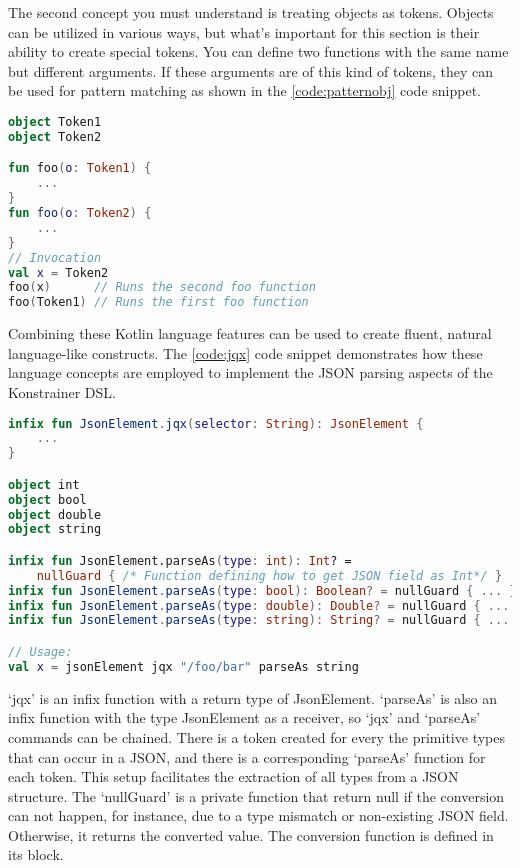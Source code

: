The second concept you must understand is treating objects as tokens. Objects can be utilized in various ways, but what's important for this section is their ability to create special tokens. You can define two functions with the same name but different arguments. If these arguments are of this kind of tokens, they can be used for pattern matching as shown in the \ref{code:patternobj} code snippet.

\begin{lstlisting}[caption={Pattern matching},language=Kotlin,label=code:patternobj]
object Token1
object Token2

fun foo(o: Token1) {
    ...
}
fun foo(o: Token2) {
    ...
}
// Invocation
val x = Token2
foo(x)      // Runs the second foo function
foo(Token1) // Runs the first foo function
\end{lstlisting}

Combining these Kotlin language features can be used to create fluent, natural language-like constructs. The \ref{code:jqx} code snippet demonstrates how these language concepts are employed to implement the JSON parsing aspects of the Konstrainer DSL.

\begin{lstlisting}[caption={jqx implementation},language=Kotlin,label=code:jqx]
infix fun JsonElement.jqx(selector: String): JsonElement {
    ...
}

object int
object bool
object double
object string

infix fun JsonElement.parseAs(type: int): Int? = 
    nullGuard { /* Function defining how to get JSON field as Int*/ }
infix fun JsonElement.parseAs(type: bool): Boolean? = nullGuard { ... }
infix fun JsonElement.parseAs(type: double): Double? = nullGuard { ... }
infix fun JsonElement.parseAs(type: string): String? = nullGuard { ... }

// Usage:
val x = jsonElement jqx "/foo/bar" parseAs string
\end{lstlisting}

`jqx' is an infix function with a return type of JsonElement. `parseAs' is also an infix function with the type JsonElement as a receiver, so `jqx' and `parseAs' commands can be chained. There is a token created for every the primitive types that can occur in a JSON, and there is a corresponding `parseAs' function for each token. This setup facilitates the extraction of all types from a JSON structure. The `nullGuard' is a private function that return null if the conversion can not happen, for instance, due to a type mismatch or non-existing JSON field. Otherwise, it returns the converted value. The conversion function is defined in its block.

